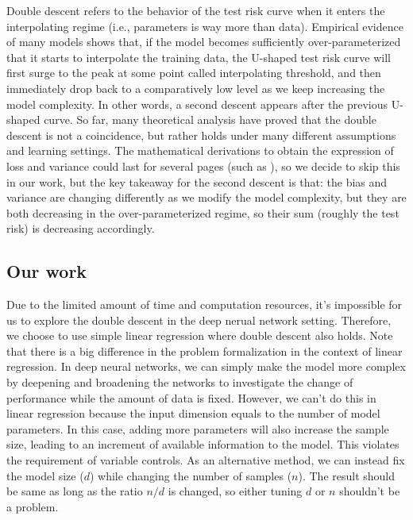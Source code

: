 \documentclass{article}
\begin{document}
\vspace{-3mm}
Double descent refers to the behavior of the test risk curve when it enters the interpolating regime (i.e., parameters is way more than data). Empirical evidence of many models shows that, if the model becomes sufficiently over-parameterized that it starts to interpolate the training data, the U-shaped test risk curve will first surge to the peak at some point called interpolating threshold, and then immediately drop back to a comparatively low level as we keep increasing the model complexity. In other words, a second descent appears after the previous U-shaped curve. So far, many theoretical analysis have proved that the double descent is not a coincidence, but rather holds under many different assumptions and learning settings. The mathematical derivations to obtain the expression of loss and variance could last for several pages (such as \cite{hastie2022surprises}), so we decide to skip this in our work, but the key takeaway for the second descent is that: the bias and variance are changing differently as we modify the model complexity, but they are both decreasing in the over-parameterized regime, so their sum (roughly the test risk) is decreasing accordingly.

\vspace{-2mm}
\subsection{Our work} \label{our}
\vspace{-1mm}
Due to the limited amount of time and computation resources, it's impossible for us to explore the double descent in the deep nerual network setting. Therefore, we choose to use simple linear regression where double descent also holds. Note that there is a big difference in the problem formalization in the context of linear regression. In deep neural networks, we can simply make the model more complex by deepening and broadening the networks to investigate the change of performance while the amount of data is fixed. However, we can't do this in linear regression because the input dimension equals to the number of model parameters. In this case, adding more parameters will also increase the sample size, leading to an increment of available information to the model. This violates the requirement of variable controls. As an alternative method, we can instead fix the model size ($d$) while changing the number of samples ($n$). The result should be same as long as the ratio $n/d$ is changed, so either tuning $d$ or $n$ shouldn't be a problem.\\
\end{document}
